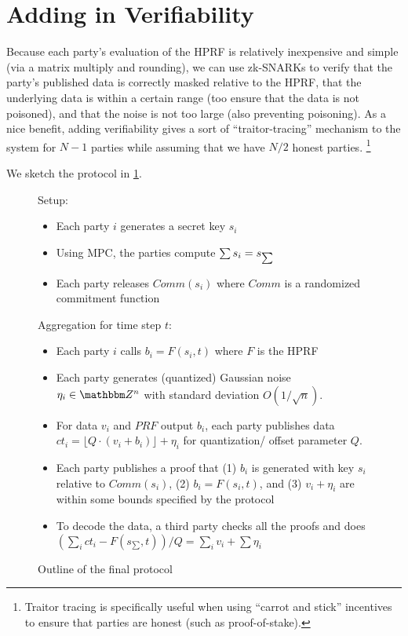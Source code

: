 \section{Adding in Verifiability}
Because each party's evaluation of the HPRF is relatively inexpensive and simple (via a matrix multiply and rounding), we can use zk-SNARKs to verify that the party's published data is correctly masked relative to the HPRF, that the underlying data is within a certain range (too ensure that the data is not poisoned), and that the noise is not too large (also preventing poisoning).
As a nice benefit, adding verifiability gives a sort of ``traitor-tracing'' mechanism to the system for $N - 1$ parties while assuming that we have $N /2$ honest parties.
\footnote{Traitor tracing is specifically useful when using ``carrot and stick'' incentives to ensure that parties are honest (such as proof-of-stake).}

We sketch the protocol in \cref{fig:prot}.


\begin{figure}[H]
	\begin{mdframed}
		Setup: \begin{itemize}
			\item Each party $i$ generates a secret key $s_i$
			\item Using MPC, the parties compute $\sum s_i = s_{\sum}$
			\item Each party releases $Comm(s_i)$ where $Comm$ is a randomized commitment function
		\end{itemize}
		Aggregation for time step $t$: \begin{itemize}
			\item Each party $i$ calls $b_i = F(s_i, t)$  where $F$ is the HPRF
			\item Each party generates (quantized) Gaussian noise $\eta_i \in \Z^n$ with standard deviation $O(1/\sqrt{n})$.
			\item  For data $v_i$ and $PRF$ output $b_i$,
				each party publishes data $ct_i = \lfloor Q \cdot (v_i + b_i) \rfloor  + \eta_i$ for quantization/ offset parameter $Q$.
			\item Each party publishes a proof that (1) $b_i$ is generated with key $s_i$ relative to $Comm(s_i)$, (2) $b_i = F(s_i, t)$, and (3) $v_i + \eta_i$ are within some bounds specified by the protocol
			\item To decode the data, a third party checks all the proofs and does $\left(\sum_i ct_i - F(s_{\sum}, t)\right) / Q = \sum_i v_i + \sum \eta_i$
		\end{itemize}
	\end{mdframed}
	\caption{Outline of the final protocol}
	\label{fig:prot}
\end{figure}

